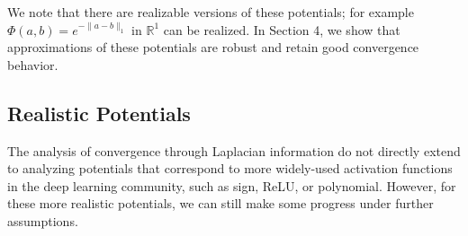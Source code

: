 \documentclass{article}
\newcommand{\R}{{\mathbb{R}}}
\begin{document}
We note that there are realizable versions of these potentials; for example $\Phi(a,b) = e^{-\|a-b\|_1}$ in $\R^1$ can be realized. In Section 4, we show that approximations of these potentials are robust and retain good convergence behavior. 

\subsection{Realistic Potentials}

The analysis of convergence through Laplacian information do not directly extend to analyzing potentials that correspond to more widely-used activation functions in the deep learning community, such as sign, ReLU, or polynomial. However, for these more realistic potentials, we can still make some progress under further assumptions. 
\end{document}

